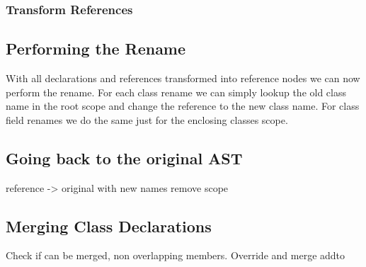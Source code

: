 \subsubsection{Transform References}

\subsection{Performing the Rename}\label{subsec:performing-the-rename}

With all declarations and references transformed into reference nodes we can now perform the rename.
For each class rename we can simply lookup the old class name in the root scope and change the reference to the new class name.
For class field renames we do the same just for the enclosing classes scope.

\subsection{Going back to the original AST}\label{subsec:going-back-to-the-original-ast}

reference -> original with new names
remove scope

\subsection{Merging Class Declarations}\label{subsec:merging-class-declarations}

Check if can be merged, non overlapping members.
Override and merge addto